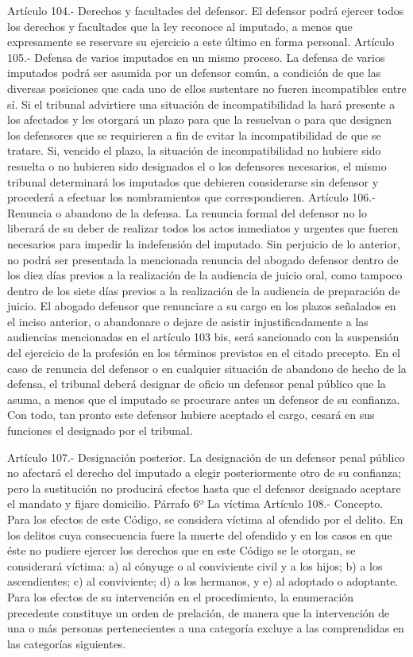     Artículo 104.- Derechos y facultades del defensor. El defensor podrá ejercer todos los derechos y facultades que la ley reconoce al imputado, a menos que expresamente se reservare su ejercicio a este último en forma personal.
    Artículo 105.- Defensa de varios imputados en un mismo proceso. La defensa de varios imputados podrá ser asumida por un defensor común, a condición de que las diversas posiciones que cada uno de ellos sustentare no fueren incompatibles entre sí.
    Si el tribunal advirtiere una situación de incompatibilidad la hará presente a los afectados y les otorgará un plazo para que la resuelvan o para que designen los defensores que se requirieren a fin de evitar la incompatibilidad de que se tratare. Si, vencido el plazo, la situación de incompatibilidad no hubiere sido resuelta o no hubieren sido designados el o los defensores necesarios, el mismo tribunal determinará los imputados que debieren considerarse sin defensor y procederá a efectuar los nombramientos que correspondieren.
    Artículo 106.- Renuncia o abandono de la defensa. La renuncia formal del defensor no lo liberará de su deber de realizar todos los actos inmediatos y urgentes que fueren necesarios para impedir la indefensión del imputado.
    Sin perjuicio de lo anterior, no podrá ser presentada la mencionada renuncia del abogado defensor dentro de los diez días previos a la realización de la audiencia de juicio oral, como tampoco dentro de los siete días previos a la realización de la audiencia de preparación de juicio.
    El abogado defensor que renunciare a su cargo en los plazos señalados en el inciso anterior, o abandonare o dejare de asistir injustificadamente a las audiencias mencionadas en el artículo 103 bis, será sancionado con la suspensión del ejercicio de la profesión en los términos previstos en el citado precepto.
    En el caso de renuncia del defensor o en cualquier situación de abandono de hecho de la defensa, el tribunal deberá designar de oficio un defensor penal público que la asuma, a menos que el imputado se procurare antes un defensor de su confianza. Con todo, tan pronto este defensor hubiere aceptado el cargo, cesará en sus funciones el designado por el tribunal.

    Artículo 107.- Designación posterior. La designación de un defensor penal público no afectará el derecho del imputado a elegir posteriormente otro de su confianza; pero la sustitución no producirá efectos hasta que el defensor designado aceptare el mandato y fijare domicilio.
    Párrafo 6º La víctima
    Artículo 108.- Concepto. Para los efectos de este Código, se considera víctima al ofendido por el delito.
    En los delitos cuya consecuencia fuere la muerte del ofendido y en los casos en que éste no pudiere ejercer los derechos que en este Código se le otorgan, se considerará víctima:
    a) al cónyuge o al conviviente civil y a los hijos;
    b) a los ascendientes;
    c) al conviviente;
    d) a los hermanos, y
    e) al adoptado o adoptante.
    Para los efectos de su intervención en el procedimiento, la enumeración precedente constituye un orden de prelación, de manera que la intervención de una o más personas pertenecientes a una categoría excluye a las comprendidas en las categorías siguientes.


